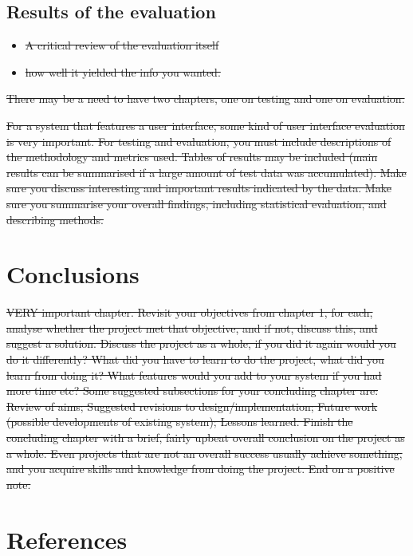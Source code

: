 \documentclass[12pt,a4paper,]{adreport}
\begin{document}
\section{Results of the evaluation}\label{results-of-the-evaluation}

\begin{itemize}
\itemsep1pt\parskip0pt
\item
  \sout{A critical review of the evaluation itself}
\item
  \sout{how well it yielded the info you wanted.}
\end{itemize}

\sout{There may be a need to have two chapters, one on testing and one
on evaluation.}

\sout{For a system that features a user interface, some kind of user
interface evaluation is very important. For testing and evaluation, you
must include descriptions of the methodology and metrics used. Tables of
results may be included (main results can be summarised if a large
amount of test data was accumulated). Make sure you discuss interesting
and important results indicated by the data. Make sure you summarise
your overall findings, including statistical evaluation, and describing
methods.}

\chapter{Conclusions}\label{conclusions}

\sout{VERY important chapter. Revisit your objectives from chapter 1,
for each, analyse whether the project met that objective, and if not,
discuss this, and suggest a solution. Discuss the project as a whole, if
you did it again would you do it differently? What did you have to learn
to do the project, what did you learn from doing it? What features would
you add to your system if you had more time etc? Some suggested
subsections for your concluding chapter are: Review of aims; Suggested
revisions to design/implementation; Future work (possible developments
of existing system); Lessons learned. Finish the concluding chapter with
a brief, fairly upbeat overall conclusion on the project as a whole.
Even projects that are not an overall success usually achieve something,
and you acquire skills and knowledge from doing the project. End on a
positive note.}

\chapter{References}\label{references}
\end{document}
